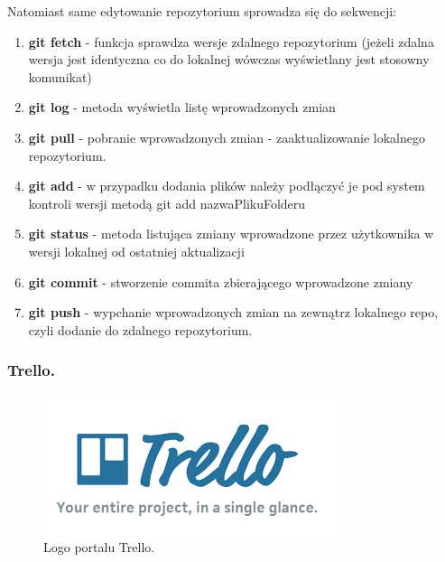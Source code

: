 \documentclass[a4paper,12pt]{article}		%
\begin{document}
Natomiast same edytowanie repozytorium sprowadza się do sekwencji:
\begin{enumerate}
\item \textbf{git fetch} - funkcja sprawdza wersje zdalnego repozytorium (jeżeli zdalna wersja jest identyczna co do lokalnej wówczas wyświetlany jest stosowny komunikat)
\item \textbf{git log} - metoda wyświetla listę wprowadzonych zmian
\item \textbf{git pull} - pobranie wprowadzonych zmian - zaaktualizowanie lokalnego repozytorium.
\item \textbf{git add} -  w przypadku dodania plików należy podłączyć je pod system kontroli wersji metodą git add nazwaPlikuFolderu
\item \textbf{git status} - metoda listująca zmiany wprowadzone przez użytkownika w wersji lokalnej od ostatniej aktualizacji
\item \textbf{git commit} - stworzenie commita zbierającego wprowadzone zmiany
\item \textbf{git push} - wypchanie wprowadzonych zmian na zewnątrz lokalnego repo, czyli dodanie do zdalnego repozytorium.
\end{enumerate}

\subsubsection{Trello.}

\begin{figure}[h!]
\centering
\includegraphics[scale=0.6]{Resources/Trello_Logo.png}
\caption{Logo portalu Trello.} 
\end{figure} 
\end{document}
